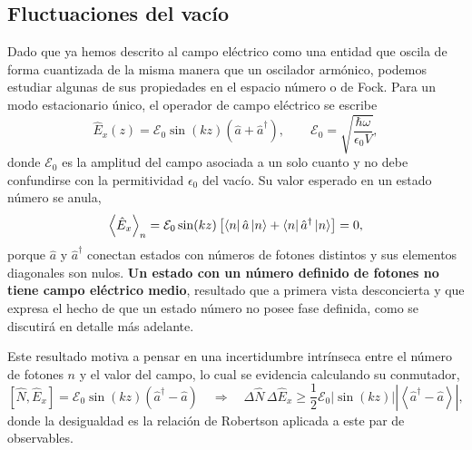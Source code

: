     \subsection{Fluctuaciones del vacío}

        Dado que ya hemos descrito al campo eléctrico como una entidad que oscila de forma cuantizada de la misma manera que un oscilador armónico, podemos estudiar algunas de sus propiedades en el espacio número o de Fock. Para un modo estacionario único, el operador de campo eléctrico se escribe
        \begin{equation}\label{eq:CampoModoUnico}
            \hat{E}_{x}(z) = \mathcal{E}_{0}\sin(kz)\left(\hat{a} + \hat{a}^{\dagger}\right),
            \qquad
            \mathcal{E}_{0} = \sqrt{\frac{\hbar\omega}{\epsilon_{0}V}},
        \end{equation}
        donde $\mathcal{E}_{0}$ es la amplitud del campo asociada a un solo cuanto y no debe confundirse con la permitividad $\epsilon_{0}$ del vacío. Su valor esperado en un estado número se anula,
        \begin{equation}
            \left\langle \hat{E}_{x} \right\rangle_{n} = \mathcal{E}_{0}\sin(kz)\left[\bra{n}\hat{a}\ket{n} + \bra{n}\hat{a}^{\dagger}\ket{n}\right] = 0,
        \end{equation}
        porque $\hat{a}$ y $\hat{a}^{\dagger}$ conectan estados con números de fotones distintos y sus elementos diagonales son nulos. \textbf{Un estado con un número definido de fotones no tiene campo eléctrico medio}, resultado que a primera vista desconcierta y que expresa el hecho de que un estado número no posee fase definida, como se discutirá en detalle más adelante.

        Este resultado motiva a pensar en una incertidumbre intrínseca entre el número de fotones $n$ y el valor del campo, lo cual se evidencia calculando su conmutador,
        \begin{equation}
            \left[\hat{N}, \hat{E}_{x}\right] = \mathcal{E}_{0}\sin(kz)\left(\hat{a}^{\dagger} -\hat{a}\right)
            \quad\Longrightarrow\quad
            \Delta \hat{N}\,\Delta\hat{E}_{x} \geq \frac{1}{2}\mathcal{E}_{0}\left|\sin(kz)\right|\left|\left\langle\hat{a}^{\dagger} - \hat{a}\right\rangle\right|,
        \end{equation}
        donde la desigualdad es la relación de Robertson aplicada a este par de observables.

